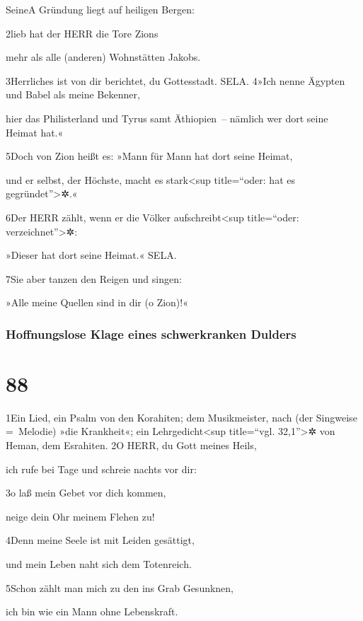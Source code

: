 Seine{A} Gründung liegt auf heiligen Bergen:

2lieb hat der HERR die Tore Zions

mehr als alle (anderen) Wohnstätten Jakobs.

3Herrliches ist von dir berichtet, du Gottesstadt. SELA. 4»Ich nenne
Ägypten und Babel als meine Bekenner,

hier das Philisterland und Tyrus samt Äthiopien~-- nämlich wer dort
seine Heimat hat.«

5Doch von Zion heißt es: »Mann für Mann hat dort seine Heimat,

und er selbst, der Höchste, macht es stark\textless sup title=``oder:
hat es gegründet''\textgreater✲.«

6Der HERR zählt, wenn er die Völker aufschreibt\textless sup
title=``oder: verzeichnet''\textgreater✲:

»Dieser hat dort seine Heimat.« SELA.

7Sie aber tanzen den Reigen und singen:

»Alle meine Quellen sind in dir (o Zion)!«

\hypertarget{hoffnungslose-klage-eines-schwerkranken-dulders}{%
\subsubsection{Hoffnungslose Klage eines schwerkranken
Dulders}\label{hoffnungslose-klage-eines-schwerkranken-dulders}}

\hypertarget{section-87}{%
\section{88}\label{section-87}}

1Ein Lied, ein Psalm von den Korahiten; dem Musikmeister, nach (der
Singweise =~Melodie) »die Krankheit«; ein Lehrgedicht\textless sup
title=``vgl. 32,1''\textgreater✲ von Heman, dem Esrahiten. 2O HERR, du
Gott meines Heils,

ich rufe bei Tage und schreie nachts vor dir:

3o laß mein Gebet vor dich kommen,

neige dein Ohr meinem Flehen zu!

4Denn meine Seele ist mit Leiden gesättigt,

und mein Leben naht sich dem Totenreich.

5Schon zählt man mich zu den ins Grab Gesunknen,

ich bin wie ein Mann ohne Lebenskraft.

